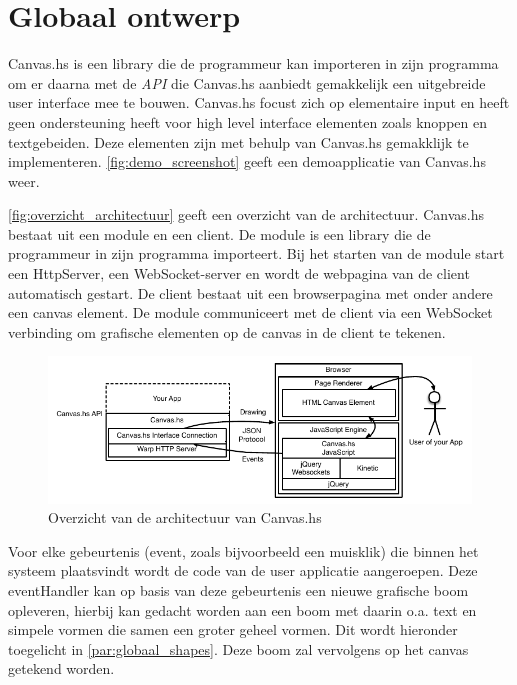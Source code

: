 \section{Globaal ontwerp}  \label{sec:globaal}
Canvas.hs is een library die de programmeur kan importeren in zijn programma om er daarna met de \emph{API} die Canvas.hs aanbiedt gemakkelijk een uitgebreide user interface mee te bouwen. Canvas.hs focust zich op elementaire input en heeft geen ondersteuning heeft voor high level interface elementen zoals knoppen en textgebeiden. Deze elementen zijn met behulp van Canvas.hs gemakklijk te implementeren. \autoref{fig:demo_screenshot} geeft een demoapplicatie van Canvas.hs weer.


\autoref{fig:overzicht_architectuur} geeft een overzicht van de architectuur. Canvas.hs bestaat uit een module en een client. De module is een library die de programmeur in zijn programma importeert. Bij het starten van de module start een HttpServer, een WebSocket-server en wordt de webpagina van de client automatisch gestart. De client bestaat uit een browserpagina met onder andere een canvas element. De module communiceert met de client via een WebSocket verbinding om grafische elementen op de canvas in de client te tekenen.

\begin{figure}[H]
\begin{center}
\includegraphics[keepaspectratio,width=\textwidth]{./images/architectuur_overzicht.pdf}
\caption{Overzicht van de architectuur van Canvas.hs}
\label{fig:overzicht_architectuur}
\end{center}
\end{figure}


Voor elke gebeurtenis (event, zoals bijvoorbeeld een muisklik) die binnen het systeem plaatsvindt wordt de code van de user applicatie aangeroepen. Deze eventHandler kan op basis van deze gebeurtenis een nieuwe grafische boom opleveren, hierbij kan gedacht worden aan een boom met daarin o.a. text en simpele vormen die samen een groter geheel vormen. Dit wordt hieronder toegelicht in \autoref{par:globaal_shapes}. Deze boom zal vervolgens op het canvas getekend worden. 

